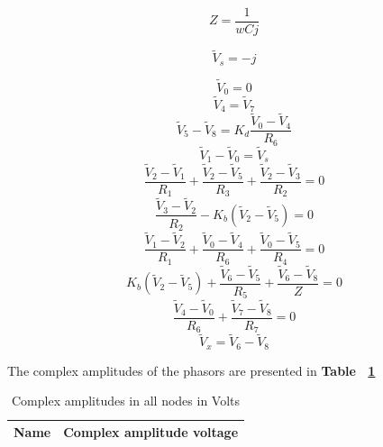 \begin {equation}
	Z = \frac{1}{w C j}
	\label{eq:Z}
\end{equation}

\begin {equation}
	\tilde{V}_s = -j
	\label{eq:vs}
\end{equation}

\begin {equation}
	\tilde{V}_0 = 0
	\label{eq:p1}
\end{equation}
\begin {equation}
	\tilde{V}_4 = \tilde{V}_7
	\label{eq:p2}
\end{equation}
\begin {equation}
	\tilde{V}_5 - \tilde{V}_8 = K_d \frac{\tilde{V}_0 - \tilde{V}_4}{R_6}
	\label{eq:p3}
\end{equation}
\begin {equation}
	\tilde{V}_1 - \tilde{V}_0 = \tilde{V}_s
	\label{eq:p4}
\end{equation}
\begin {equation}
	\frac{\tilde{V}_2-\tilde{V}_1}{R_1} + \frac{\tilde{V}_2 - \tilde{V}_5}{R_3} + \frac{\tilde{V}_2 - \tilde{V}_3}{R_2} = 0
	\label{eq:p5}
\end{equation}
\begin {equation}
	\frac{\tilde{V}_3-\tilde{V}_2}{R_2} - K_b(\tilde{V}_2-\tilde{V}_5)  = 0
	\label{eq:p6}
\end{equation}
\begin {equation}
	\frac{\tilde{V}_1-\tilde{V}_2}{R_1} + \frac{\tilde{V}_0-\tilde{V}_4}{R_6} + \frac{\tilde{V}_0-\tilde{V}_5}{R_4} = 0
	\label{eq:p7}
\end{equation}
\begin {equation}
	K_b(\tilde{V}_2-\tilde{V}_5) + \frac{\tilde{V}_6-\tilde{V}_5}{R_5} + \frac{\tilde{V}_6-\tilde{V}_8}{Z}  = 0
	\label{eq:p8}
\end{equation}
\begin {equation}
	\frac{\tilde{V}_4-\tilde{V}_0}{R_6} + \frac{\tilde{V}_7 - \tilde{V}_8}{R_7} = 0
	\label{eq:p9}
\end{equation}
\begin {equation}
	\tilde{V}_x = \tilde{V}_6 - \tilde{V}_8
	\label{eq:p10}
\end{equation}


The complex amplitudes of the phasors are presented in  \textbf{Table ~\ref{tab:equivalent resistor}}
\begin{table}[H]
  \centering
  \begin{tabular}{|l|r|}
    \hline    
    {\bf Name} & {\bf Complex amplitude voltage}\\ \hline
    
  \end{tabular}
  \caption{Complex amplitudes in all nodes in Volts}
  \label{tab:equivalent resistor}
\end{table}
\vspace{10cm}

